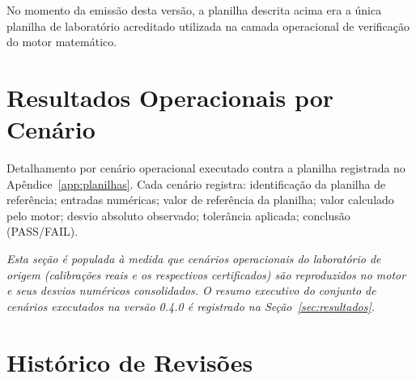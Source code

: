 \documentclass[11pt,a4paper]{article}
\newcommand{\docVersion}{0.4.0}
\begin{document}
\vspace{0.3cm}
No momento da emissão desta versão, a planilha descrita acima era a única planilha de laboratório acreditado utilizada na camada operacional de verificação do motor matemático.

\section{Resultados Operacionais por Cenário}
\label{app:planilhas-resultados}

Detalhamento por cenário operacional executado contra a planilha registrada no Apêndice~\ref{app:planilhas}. Cada cenário registra: identificação da planilha de referência; entradas numéricas; valor de referência da planilha; valor calculado pelo motor; desvio absoluto observado; tolerância aplicada; conclusão (\textsf{PASS}/\textsf{FAIL}).

\vspace{0.3cm}
\textit{Esta seção é populada à medida que cenários operacionais do laboratório de origem (calibrações reais e os respectivos certificados) são reproduzidos no motor e seus desvios numéricos consolidados. O resumo executivo do conjunto de cenários executados na versão \docVersion{} é registrado na Seção~\ref{sec:resultados}.}

\section{Histórico de Revisões}
\end{document}

